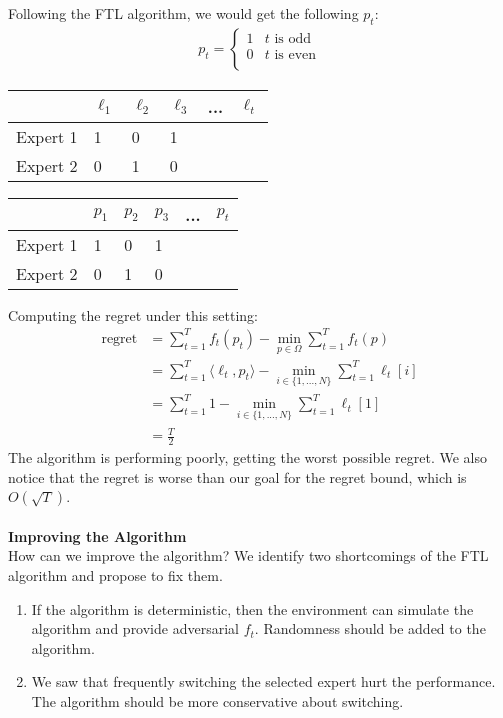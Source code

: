 \documentclass[11pt]{article}
\newcommand{\1}{\mathbb{I}} %
\begin{document}
Following the FTL algorithm, we would get the following $p_t$:
\begin{align*}
p_t = \begin{cases} 
 	     1 & t \text{ is odd} \\
 	     0 & t \text{ is even} \\
 	  \end{cases}
\end{align*}
\begin{table}[htb]
\centering
\begin{tabular}{|l|l|l|l|l|l|}
\hline
         & $\ell_1$ & $\ell_2$ & $\ell_3$ & ... & $\ell_t$ \\ \hline
Expert 1 & 1 & 0 & 1 &     &   \\ \hline
Expert 2 & 0 & 1 & 0 &     &   \\ \hline
\end{tabular}
\quad
\begin{tabular}{|l|l|l|l|l|l|}
\hline
         & $p_1$ & $p_2$ & $p_3$ & ... & $p_t$ \\ \hline
Expert 1 & 1 & 0 & 1 &     &   \\ \hline
Expert 2 & 0 & 1 & 0 &     &   \\ \hline
\end{tabular}
\end{table}

Computing the regret under this setting:
\begin{align*}
\text{regret} 
&=\sum_{t=1}^Tf_t(p_t) - \min_{p \in \Omega}\sum_{t=1}^T f_t(p)\\
&= \sum_{t=1}^T\langle \ell_t, p_t \rangle - \min_{i  \in \{1,...,N\}}\sum_{t=1}^T\ell_t[i] \\
&= \sum_{t=1}^T 1 - \min_{i  \in \{1,...,N\}}\sum_{t=1}^T\ell_t[1] \\
&= \frac{T}{2}
\end{align*}
The algorithm is performing poorly, getting the worst possible regret. We also notice that the regret is worse than our goal for the regret bound, which is $O(\sqrt{T})$. \\\\
\textbf{Improving the Algorithm}\\
How can we improve the algorithm? We identify two shortcomings of the FTL algorithm and propose to fix them.
\begin{enumerate}
\item If the algorithm is deterministic, then the environment can simulate the algorithm and provide adversarial $f_t$. Randomness should be added to the algorithm.
\item We saw that frequently switching the selected expert hurt the performance. The algorithm should be more conservative about switching. 
\end{enumerate}
\end{document}
